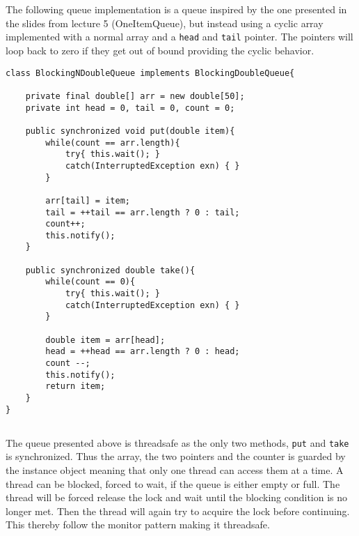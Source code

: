 \documentclass{ituhandin}
\begin{document}
\chapter{} %
\section{}

The following queue implementation is a queue inspired by the one presented in the slides from lecture 5 (OneItemQueue), but instead using a cyclic array implemented with a normal array and a \texttt{head} and \texttt{tail} pointer. The pointers will loop back to zero if they get out of bound providing the cyclic behavior.

\begin{lstlisting}[caption= Implementation of the \texttt{BlockingNDoubleQueue} blocking fixed size queue]
class BlockingNDoubleQueue implements BlockingDoubleQueue{

    private final double[] arr = new double[50];
    private int head = 0, tail = 0, count = 0;

    public synchronized void put(double item){
        while(count == arr.length){
            try{ this.wait(); }
            catch(InterruptedException exn) { }
        }

        arr[tail] = item;
        tail = ++tail == arr.length ? 0 : tail;
        count++;
        this.notify();
    }

    public synchronized double take(){
        while(count == 0){
            try{ this.wait(); }
            catch(InterruptedException exn) { }
        }

        double item = arr[head];
        head = ++head == arr.length ? 0 : head;
        count --;
        this.notify();
        return item;
    }
}
\end{lstlisting}

\section{}
The queue presented above is threadsafe as the only two methods, \texttt{put} and \texttt{take} is synchronized. Thus  the array, the two pointers and the counter is guarded by the instance object meaning that only one thread can access them at a time. A thread can be blocked, forced to wait, if the queue is either empty or full. The thread will be forced release the lock and wait until the blocking condition is no longer met. Then the thread will again try to acquire the lock before continuing. This thereby follow the monitor pattern making it threadsafe. 
\end{document}
